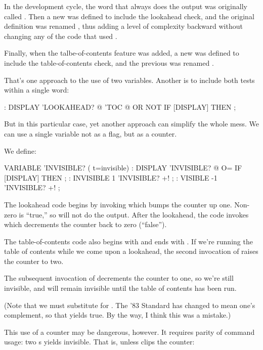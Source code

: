 In the development cycle, the word \forth{[DISPLAY]} that always does
the output was originally called . Then a new
 was defined to include the lookahead check, and the
original definition was renamed \forth{[DISPLAY]}, thus adding a level
of complexity backward without changing any of the code that used
.

Finally, when the talbe-of-contents feature was added, a new
 was defined to include the table-of-contents check,
and the previous  was renamed .

That's one approach to the use of two variables. Another is to include
both tests within a single word:

\begin{Code}
: DISPLAY   'LOOKAHEAD? @  'TOC @ OR  NOT IF [DISPLAY] THEN ;
\end{Code}
But in this particular case, yet another approach can simplify the whole
mess. We can use a single variable not as a flag, but as a counter.

We define:

\begin{Code}
VARIABLE 'INVISIBLE?  ( t=invisible)
: DISPLAY   'INVISIBLE? @  O= IF [DISPLAY] THEN ;
: INVISIBLE   1 'INVISIBLE? +! ;
: VISIBLE    -1 'INVISIBLE? +! ;
\end{Code}
The lookahead code begins by invoking  which bumps
the counter up one. Non-zero is ``true,'' so  will not
do the output.  After the lookahead, the code invokes 
which decrements the counter back to zero (``false'').

The table-of-contents code also begins with  and ends
with . If we're running the table of contents while
we come upon a lookahead, the second invocation of 
raises the counter to two.

The subsequent invocation of  decrements the counter
to one, so we're still invisible, and will remain invisible until the
table of contents has been run.

(Note that we must substitute  for . The '83
Standard has changed  to mean one's complement, so that
 yields true. By the way, I think this was a mistake.)

This use of a counter may be dangerous, however. It requires parity of
command usage: two s yields invisible. That is, unless
 clips the counter:

